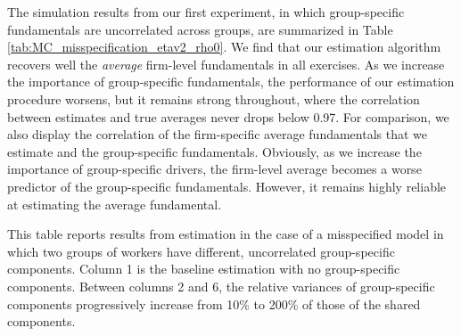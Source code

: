 The simulation results from our first experiment, in which group-specific fundamentals are uncorrelated across groups, are summarized in Table \ref{tab:MC_misspecification_etav2_rho0}. We find that our estimation algorithm recovers well the \emph{average} firm-level fundamentals in all exercises. As we increase the importance of group-specific fundamentals, the performance of our estimation procedure worsens, but it remains strong throughout, where the correlation between estimates and true averages never drops below 0.97. For comparison, we also display the correlation of the firm-specific average fundamentals that we estimate and the group-specific fundamentals. Obviously, as we increase the importance of group-specific drivers, the firm-level average becomes a worse predictor of the group-specific fundamentals. However, it remains highly reliable at estimating the average fundamental.

%
\begin{table}[htbp!]
    \caption{Estimation under uncorrelated group-specific components}
    \label{tab:MC_misspecification_etav2_rho0}
    \resizebox{\textwidth}{!}{%
    
    }
    \begin{tablenotes}
        \footnotesize
        This table reports results from estimation in the case of a misspecified model in which two groups of workers have different, uncorrelated group-specific components. Column 1 is the baseline estimation with no group-specific components. Between columns 2 and 6, the relative variances of group-specific components progressively increase from 10\% to 200\% of those of the shared components. %
    \end{tablenotes}
\end{table}
%

